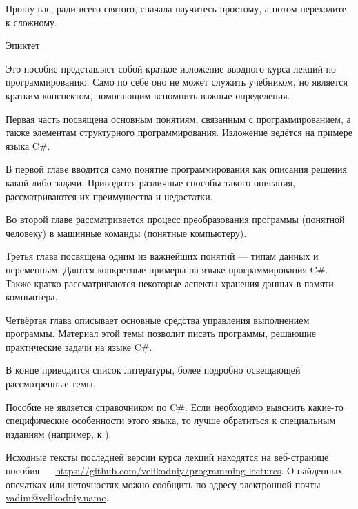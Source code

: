 
\epigraph{Прошу вас, ради всего святого, сначала научитесь простому, а
потом переходите к сложному.}{Эпиктет}

Это пособие представляет собой краткое изложение вводного курса лекций
по программированию. Само по себе оно не может служить учебником, но
является кратким конспектом, помогающим вспомнить важные определения.

Первая часть посвящена основным понятиям, связанным с
программированием, а также элементам структурного
программирования. Изложение ведётся на примере языка C\#.

В первой главе вводится само понятие программирования как описания
решения какой-либо задачи. Приводятся различные способы такого
описания, рассматриваются их преимущества и недостатки.

Во второй главе рассматривается процесс преобразования программы
(понятной человеку) в машинные команды (понятные компьютеру).

Третья глава посвящена одним из важнейших понятий — типам данных и
переменным. Даются конкретные примеры на языке программирования
C\#. Также кратко рассматриваются некоторые аспекты хранения данных в
памяти компьютера.

Четвёртая глава описывает основные средства управления выполнением
программы. Материал этой темы позволит писать программы, решающие
практические задачи на языке C\#.

В конце приводится список литературы, более подробно освещающей
рассмотренные темы.

Пособие не является справочником по C\#. Если необходимо выяснить
какие-то специфические особенности этого языка, то лучше обратиться к
специальным изданиям (например, к \cite{albahari}).

Исходные тексты последней версии курса лекций находятся на
веб-странице пособия —
\url{https://github.com/velikodniy/programming-lectures}. О найденных
опечатках или неточностях можно сообщить по адресу электронной почты
\href{mailto:vadim@veikodniy.name}{vadim@velikodniy.name}.
